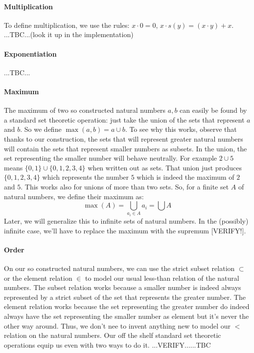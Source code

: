 \paragraph{Multiplication}
To define multiplication, we use the rules: $x \cdot 0 = 0$, $x \cdot s(y) = (x \cdot y) + x$. ...TBC...(look it up in the implementation)

\paragraph{Exponentiation} ...TBC...

\paragraph{Maximum}
The maximum of two so constructed natural numbers $a,b$ can easily be found by a standard set theoretic operation: just take the union of the sets that represent $a$ and $b$. So we define $\max(a,b) = a \cup b$. To see why this works, observe that thanks to our construction, the sets that will represent greater natural numbers will contain the sets that represent smaller numbers as subsets. In the union, the set representing the smaller number will behave neutrally. For example $2 \cup 5$ means $\{0,1\} \cup \{0,1,2,3,4\}$ when written out as sets. That union just produces $\{0,1,2,3,4\}$ which represents the number $5$ which is indeed the maximum of $2$ and $5$. This works also for unions of more than two sets. So, for a finite set $A$ of natural numbers, we define their maximum as:
\begin{equation}
\max(A) = \bigcup_{a_i \in A} a_i = \bigcup A
\end{equation}
Later, we will generalize this to infinite sets of natural numbers. In the (possibly) infinite case, we'll have to replace the maximum with the supremum [VERIFY!].

\paragraph{Order}
On our so constructed natural numbers, we can use the strict subset relation $\subset$ or the element relation $\in$ to model our usual less-than relation of the natural numbers. The subset relation works because a smaller number is indeed always represented by a strict subset of the set that represents the greater number. The element relation works because the set representing the greater number do indeed always have the set representing the smaller number as element but it's never the other way around. Thus, we don't nee to invent anything new to model our $<$ relation on the natural numbers. Our off the shelf standard set theoretic operations equip us even with two ways to do it. ...VERIFY......TBC

